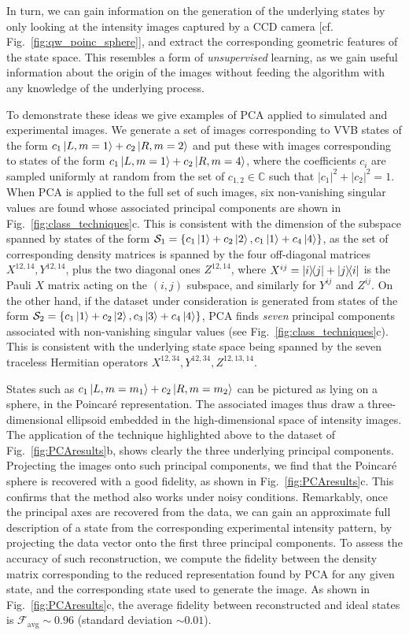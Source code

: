 In turn, we can gain information on the generation of the underlying states by only looking at the intensity images captured by a {CCD} camera [cf. Fig.~\ref{fig:qw_poinc_sphere}], and extract the corresponding geometric features of the state space. This resembles a form of \emph{unsupervised} learning, as we gain useful information about the origin of the images without feeding the algorithm with any knowledge of the underlying process.

To demonstrate these ideas we give examples of \ac{PCA} applied to simulated and experimental images. We generate a set of images corresponding to \ac{VVB} states of the form
$c_1\ket{L,m=1}+c_2\ket{R,m=2}$ and put these with images corresponding to states of the form
$c_1\ket{L,m=1}+c_2\ket{R,m=4}$, where the coefficients $c_i$ are sampled uniformly at random from the set of $c_{1,2}\in\mathbb{C}$  such that $|c_1|^2+|c_2|^2=1$.
When \ac{PCA} is applied to the full set of such images, six non-vanishing singular values are found whose associated principal components are shown in Fig.~\ref{fig:class_techniques}c.
This is consistent with the dimension of the subspace  spanned by states of the form $\mathcal S_1=\{c_1\ket1+c_2\ket2, c_1\ket1+c_4\ket4\}$,  as the set of corresponding density matrices is spanned by the four off-diagonal matrices $X^{12,14}, Y^{12,14}$, plus the two diagonal ones $Z^{12,14}$, where $X^{ij}=\ketbra{i}{j}+\ketbra{j}{i}$ is the Pauli $X$ matrix acting on the $(i,j)$ subspace, and similarly for $Y^{ij}$ and $Z^{ij}$.
On the other hand, if the dataset under consideration is generated from states of the form $\mathcal S_2=\{c_1\ket1+c_2\ket2, c_3\ket3+c_4\ket4\}$, \ac{PCA} finds \emph{seven} principal components associated with non-vanishing singular values (see Fig.~\ref{fig:class_techniques}c).
This is consistent with the underlying state space being spanned by the seven traceless Hermitian operators $X^{12,34}, Y^{12,34}, Z^{12,13,14}$.

States such as $c_1\ket{L,m=m_1}+c_2\ket{R,m=m_2}$ can be pictured as lying on a sphere, in the Poincar\'e representation. The associated images thus draw a three-dimensional ellipsoid embedded in the high-dimensional space of intensity images. The application of the technique highlighted above to the dataset of Fig.~\ref{fig:PCAresults}b, shows clearly the three underlying principal components.
Projecting the images onto such principal components, we find that the Poincar\'e sphere is recovered with a good fidelity, as shown in Fig.~\ref{fig:PCAresults}c. This confirms that the method also works under noisy conditions.
Remarkably, once the principal axes are recovered from the data, we can gain an approximate full description of a state from the corresponding experimental intensity pattern, by projecting the data vector onto the first three principal components.
To assess the accuracy of such reconstruction, we compute the fidelity between the density matrix corresponding to the reduced representation found by PCA for any given state, and the corresponding state used to generate the image. As shown in Fig.~\ref{fig:PCAresults}c, the average fidelity between reconstructed and ideal states is $\mathcal F_{\text{avg}}\sim0.96$ (standard deviation $\sim0.01$).



